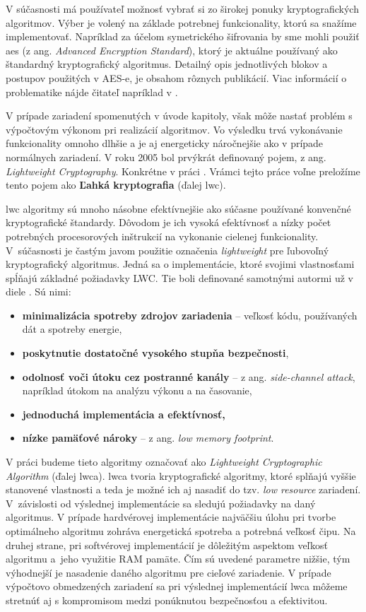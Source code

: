 V súčasnosti má používateľ možnosť vybrať si zo širokej ponuky kryptografických algoritmov. Výber je volený na základe potrebnej funkcionality, ktorú sa snažíme implementovať. Napríklad za účelom symetrického šifrovania by sme mohli použiť \acrshort{aes} \cite{aes} (z ang. \textit{Advanced Encryption Standard}), ktorý je aktuálne používaný ako štandardný kryptografický algoritmus. Detailný opis jednotlivých blokov a postupov použitých v AES-e, je obsahom rôznych publikácií. Viac informácií o problematike nájde čitateľ napríklad v \cite{levicky}.

V prípade zariadení spomenutých v úvode kapitoly, však môže nastať problém s výpočtovým výkonom pri realizácií algoritmov. Vo výsledku trvá vykonávanie funkcionality omnoho dlhšie a je aj energeticky náročnejšie ako v prípade normálnych zariadení. V roku 2005 bol prvýkrát definovaný pojem, z ang. \textit{Lightweight Cryptography}. Konkrétne v práci \cite{lwc}. Vrámci tejto práce voľne preložíme tento pojem ako \textbf{Ľahká kryptografia} (ďalej \acrshort{lwc}). 

\acrshort{lwc} algoritmy sú mnoho násobne efektívnejšie ako súčasne používané konvenčné kryptografické štandardy. Dôvodom je ich vysoká efektívnosť a nízky počet potrebných procesorových inštrukcií na vykonanie cielenej funkcionality. V~súčasnosti je častým javom použitie označenia \textit{lightweight} pre ľubovoľný kryptografický algoritmus. Jedná sa o implementácie, ktoré svojimi vlastnosťami spĺňajú základné požiadavky LWC. Tie boli definované samotnými autormi už v diele \cite{lwc}. Sú nimi: 
\begin{itemize}
	\item{\textbf{minimalizácia spotreby zdrojov zariadenia}} -- veľkosť kódu, používaných dát a spotreby energie,
	\item{\textbf{poskytnutie dostatočné vysokého stupňa bezpečnosti}},
	\item{\textbf{odolnosť voči útoku cez postranné kanály} -- z ang. \textit{side-channel attack}}, napríklad útokom na analýzu výkonu a na časovanie, 
	\item{\textbf{jednoduchá implementácia a efektívnosť,}}
	\item{\textbf{nízke pamäťové nároky}} -- z ang. \textit{low memory footprint}.
\end{itemize}

V práci budeme tieto algoritmy označovať ako \textit{Lightweight Cryptographic Algorithm} (ďalej \acrshort{lwca}).
\acrshort{lwca} tvoria kryptografické algoritmy, ktoré splňajú vyššie stanovené vlastnosti a teda je možné ich aj nasadiť do tzv. \textit{low resource} zariadení. V~závislosti od výslednej implementácie sa sledujú požiadavky na daný algoritmus. V prípade hardvérovej implementácie najväčšiu úlohu pri tvorbe optimálneho algoritmu zohráva energetická spotreba a potrebná veľkosť čipu. Na druhej strane, pri softvérovej implementácií je dôležitým aspektom veľkosť algoritmu a~jeho využitie RAM pamäte. Čím sú uvedené parametre nižšie, tým výhodnejší je nasadenie daného algoritmu pre cieľové zariadenie. V prípade výpočtovo obmedzených zariadení sa pri výslednej implementácií \acrshort{lwca} môžeme stretnúť aj s kompromisom medzi ponúknutou bezpečnosťou a efektivitou.


